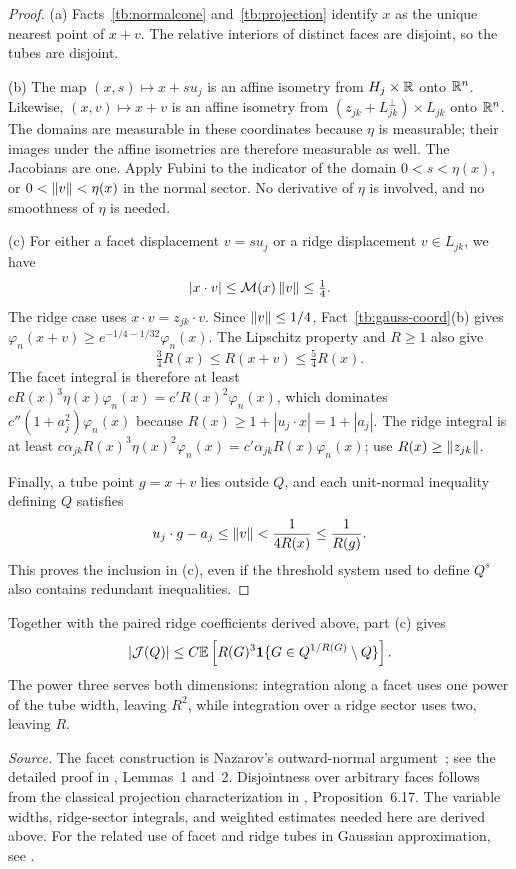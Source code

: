\begin{proof}
(a) Facts~\ref{tb:normalcone} and~\ref{tb:projection} identify \(x\)
as the unique nearest point of \(x+v\). The relative interiors of
distinct faces are disjoint, so the tubes are disjoint.

(b) The map \((x,s)\mapsto x+s u_j\) is an affine isometry from
\(H_j\times\mathbb R\) onto \(\mathbb R^n\). Likewise, \((x,v)\mapsto x+v\)
is an affine isometry from \((z_{jk}+L_{jk}^\perp)\times L_{jk}\)
onto \(\mathbb R^n\). The domains are measurable in these coordinates because \(\eta\)
is measurable; their images under the affine isometries are therefore
measurable as well. The Jacobians are one. Apply Fubini to the indicator
of the domain \(0<s<\eta(x)\), or \(0<\left\lVert v\right\rVert<\eta(x)\) in the
normal sector. No derivative of \(\eta\) is involved, and no
smoothness of \(\eta\) is needed.

(c) For either a facet displacement \(v=s u_j\) or a ridge displacement
\(v\in L_{jk}\), we have
\[
 |x\cdot v|\le\mathcal M(x)\left\lVert v\right\rVert\le\tfrac14.
\]
The ridge case uses \(x\cdot v=z_{jk}\cdot v\). Since
\(\left\lVert v\right\rVert\le1/4\), Fact~\ref{tb:gauss-coord}(b) gives
\(\varphi_n(x+v)\ge e^{-1/4-1/32}\varphi_n(x)\).
The Lipschitz property and \(R\ge1\) also give
\[
 \tfrac34R(x)\le R(x+v)\le\tfrac54R(x).
\]
The facet integral is therefore at least
\(cR(x)^3\eta(x)\varphi_n(x)=c'R(x)^2\varphi_n(x)\), which
dominates \(c''(1+a_j^2)\varphi_n(x)\) because
\(R(x)\ge1+|u_j\cdot x|=1+|a_j|\). The ridge integral is at least
\(c\alpha_{jk}R(x)^3\eta(x)^2\varphi_n(x)
=c'\alpha_{jk}R(x)\varphi_n(x)\); use
\(R(x)\ge\left\lVert z_{jk}\right\rVert\).

Finally, a tube point \(g=x+v\) lies outside \(Q\), and each
unit-normal inequality defining \(Q\) satisfies
\[
 u_j\cdot g-a_j\le\left\lVert v\right\rVert<\frac1{4R(x)}\le\frac1{R(g)}.
\]
This proves the inclusion in (c), even if the threshold system used
to define \(Q^s\) also contains redundant inequalities.
\end{proof}

Together with the paired ridge coefficients derived above, part (c)
gives
\[
 |\mathcal J(Q)|\le C\mathbb E\left[R(G)^3
              \mathbf 1\{G\in Q^{1/R(G)}\setminus Q\}\right].
\]
The power three serves both dimensions: integration along a facet
uses one power of the tube width, leaving \(R^2\), while integration
over a ridge sector uses two, leaving \(R\).

\emph{Source.} The facet construction is Nazarov's outward-normal
argument~; see the detailed proof in ,
Lemmas~1 and~2. Disjointness over arbitrary faces follows from the
classical projection characterization in , Proposition~6.17.
The variable widths, ridge-sector integrals, and weighted estimates
needed here are derived above. For the related use of facet and ridge
tubes in Gaussian approximation, see .

